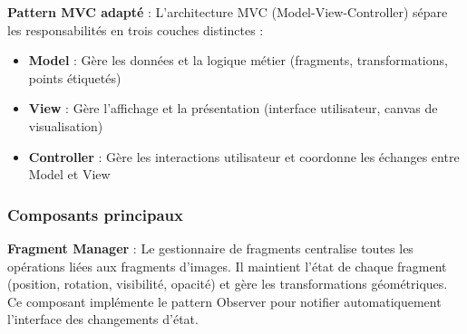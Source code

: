 \documentclass[12pt,a4paper]{report}
\begin{document}
\begin{}
\begin{}
\begin{}
\textbf{Pattern MVC adapté} : L'architecture MVC (Model-View-Controller) sépare les responsabilités en trois couches distinctes :
\begin{itemize}
\item \textbf{Model} : Gère les données et la logique métier (fragments, transformations, points étiquetés)
\item \textbf{View} : Gère l'affichage et la présentation (interface utilisateur, canvas de visualisation)
\item \textbf{Controller} : Gère les interactions utilisateur et coordonne les échanges entre Model et View
\end{itemize}

\subsubsection{Composants principaux}

\textbf{Fragment Manager} : Le gestionnaire de fragments centralise toutes les opérations liées aux fragments d'images. Il maintient l'état de chaque fragment (position, rotation, visibilité, opacité) et gère les transformations géométriques. Ce composant implémente le pattern Observer pour notifier automatiquement l'interface des changements d'état.

\begin{figure}[H]
\centering
{}
\end{figure}
\end{}
\end{}
\end{}
\end{document}
